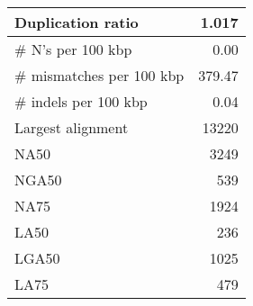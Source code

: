 \documentclass[12pt,a4paper]{article}
\begin{document}
\begin{table}[ht]
\begin{center}
\begin{tabular}{|l*{1}{|r}|}
Duplication ratio & 1.017 \\ \hline
\# N's per 100 kbp & 0.00 \\ \hline
\# mismatches per 100 kbp & 379.47 \\ \hline
\# indels per 100 kbp & 0.04 \\ \hline
Largest alignment & 13220 \\ \hline
NA50 & 3249 \\ \hline
NGA50 & 539 \\ \hline
NA75 & 1924 \\ \hline
LA50 & 236 \\ \hline
LGA50 & 1025 \\ \hline
LA75 & 479 \\ \hline
\end{tabular}
\end{center}
\end{table}
\end{document}
